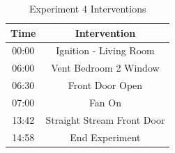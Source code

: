 \documentclass{article}
\begin{document}
\begin{table}[H]
	\centering
	\caption{Experiment 4 Interventions}
	\begin{tabular}{|c|c|} 
		\hline
		Time & Intervention \\ \hline \hline
		00:00 & Ignition - Living Room \\ \hline
		06:00 & Vent Bedroom 2 Window \\ \hline
		06:30 & Front Door Open \\ \hline
		07:00 & Fan On \\ \hline
		13:42 & Straight Stream Front Door \\ \hline
		14:58 & End Experiment \\ \hline
	\end{tabular}
	\label{Table:Exp4Interventions}
\end{table}

\clearpage
\end{document}
